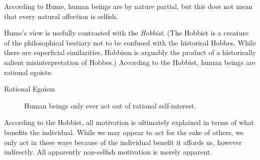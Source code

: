 
According to Hume, human beings are by nature partial, but this does not mean that every natural affection is selfish.

Hume's view is usefully contrasted with the \emph{Hobbist}. (The Hobbist is a creature of the philosophical bestiary not to be confused with the historical Hobbes. While there are superficial similarities, Hobbism is arguably the product of a historically salient misinterpretation of Hobbes.) According to the Hobbist, human beings are rational egoists:

\begin{description}
    \item[Rational Egoism] Human beings only ever act out of rational self-interest.
\end{description}

According to the Hobbist, all motivation is ultimately explained in terms of what benefits the individual. While we may appear to act for the sake of others, we only act in these ways because of the individual benefit it affords us, however indirectly. All apparently non-selfish motivation is merely apparent.

